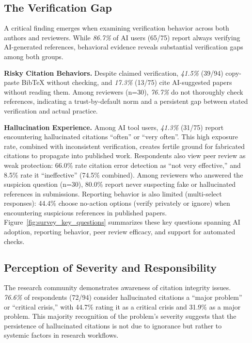 \subsection{The Verification Gap}

A critical finding emerges when examining verification behavior across both authors and reviewers.
While \textit{86.7\%} of AI users (65/75) report always verifying AI-generated references, behavioral evidence reveals substantial verification gaps among both groups.

\noindent
\textbf{Risky Citation Behaviors.}
Despite claimed verification, \textit{41.5\%} (39/94) copy-paste BibTeX without checking, and \textit{17.3\%} (13/75) cite AI-suggested papers without reading them. Among reviewers (n=30), \textit{76.7\%} do not thoroughly check references, indicating a trust-by-default norm and a persistent gap between stated verification and actual practice.

\noindent
\textbf{Hallucination Experience.}
Among AI tool users, \textit{41.3\%} (31/75) report encountering hallucinated citations ``often'' or ``very often''.
This high exposure rate, combined with inconsistent verification, creates fertile ground for fabricated citations to propagate into published work.
Respondents also view peer review as weak protection: 66.0\% rate citation error detection as ``not very effective,'' and 8.5\% rate it ``ineffective'' (74.5\% combined).
Among reviewers who answered the suspicion question (n=30), 80.0\% report never suspecting fake or hallucinated references in submissions.
Reporting behavior is also limited (multi-select responses): 44.4\% choose no-action options (verify privately or ignore) when encountering suspicious references in published papers.
Figure~\ref{fig:survey_key_questions} summarizes these key questions spanning AI adoption, reporting behavior, peer review efficacy, and support for automated checks.



\subsection{Perception of Severity and Responsibility}

The research community demonstrates awareness of citation integrity issues.
\textit{76.6\%} of respondents (72/94) consider hallucinated citations a ``major problem'' or ``critical crisis,'' with 44.7\% rating it as a critical crisis and 31.9\% as a major problem.
This majority recognition of the problem's severity suggests that the persistence of hallucinated citations is not due to ignorance but rather to systemic factors in research workflows.

